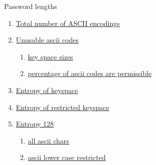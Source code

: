 \documentclass{assignment}
\begin{document}
\begin{problemlist}
		\pbitem Password lengths
		\begin{problem}
			\begin{answer}
				\begin{enumerate}
					\item \underline{Total number of ASCII encodings}
					\item \underline{Unusable ascii codes}
						\begin{enumerate}
							\item \underline{key space sizes}
							\item \underline{percentage of ascii codes are permissible}
						\end{enumerate}
					\item \underline{Entropy of keyspace}
					\item \underline{Entropy of restricted keyspace}
					\item \underline{Entropy 128}
						\begin{enumerate}
							\item \underline{all ascii chars}
							\item \underline{ascii lower case restricted}
						\end{enumerate}
				\end{enumerate}
			\end{answer}
		\end{problem}
		\newpage


	\end{problemlist}
\end{document}
